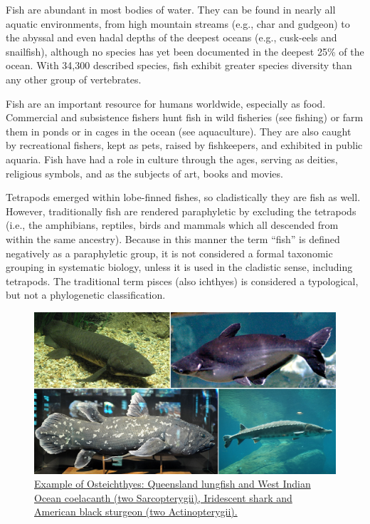 Fish are abundant in most bodies of water. They can be found in nearly all aquatic environments, from high mountain streams (e.g., char and gudgeon) to the abyssal and even hadal depths of the deepest oceans (e.g., cusk-eels and snailfish), although no species has yet been documented in the deepest 25\% of the ocean. With 34,300 described species, fish exhibit greater species diversity than any other group of vertebrates.

Fish are an important resource for humans worldwide, especially as food. Commercial and subsistence fishers hunt fish in wild fisheries (see fishing) or farm them in ponds or in cages in the ocean (see aquaculture). They are also caught by recreational fishers, kept as pets, raised by fishkeepers, and exhibited in public aquaria. Fish have had a role in culture through the ages, serving as deities, religious symbols, and as the subjects of art, books and movies.

Tetrapods emerged within lobe-finned fishes, so cladistically they are fish as well. However, traditionally fish are rendered paraphyletic by excluding the tetrapods (i.e., the amphibians, reptiles, birds and mammals which all descended from within the same ancestry). Because in this manner the term ``fish'' is defined negatively as a paraphyletic group, it is not considered a formal taxonomic grouping in systematic biology, unless it is used in the cladistic sense, including tetrapods. The traditional term pisces (also ichthyes) is considered a typological, but not a phylogenetic classification.



\begin{figure}

{\centering \includegraphics[width=0.7\linewidth]{./figures/animals/Osteichthyes} 

}

\caption{\href{https://commons.wikimedia.org/wiki/File:Osteichthyes.jpg}{Example of Osteichthyes: Queensland lungfish and West Indian Ocean coelacanth (two Sarcopterygii), Iridescent shark and American black sturgeon (two Actinopterygii).}}\label{fig:osteichthyes}
\end{figure}

